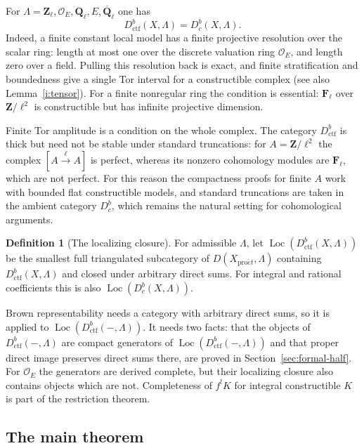 \documentclass[11pt,a4paper]{article}
\numberwithin{equation}{section}
\theoremstyle{definition}
\newtheorem{definition}[theorem]{Definition}
\theoremstyle{remark}
\newcommand{\Dbc}{D^b_c}
\newcommand{\Loc}{\operatorname{Loc}}
\newcommand{\Qbar}{\overline{\mathbf Q}_\ell}
\newcommand{\Ql}{\mathbf Q_\ell}
\newcommand{\Zl}{\mathbf Z_\ell}
\newcommand{\proet}{\mathrm{pro}\acute{e}t}
\newcommand{\Dctf}{D^b_{\mathrm{ctf}}}
\begin{document}
For $\Lambda=\Zl,\mathcal O_E,\Ql,E,\Qbar$ one has
\[
 \Dctf(X,\Lambda)=\Dbc(X,\Lambda).
\]
Indeed, a finite constant local model has a finite projective resolution
over the scalar ring: length at most one over the discrete valuation
ring $\mathcal O_E$, and length zero over a field. Pulling this
resolution back is exact, and finite stratification and boundedness
give a single Tor interval for a constructible complex
(see also Lemma~\ref{i:tensor}). For a finite nonregular ring the
condition is essential: $\mathbf F_\ell$ over $\mathbf Z/\ell^2$ is
constructible but has infinite projective dimension.

Finite Tor amplitude is a condition on the whole complex. The category
$\Dctf$ is thick but need not be stable under standard truncations:
for $A=\mathbf Z/\ell^2$ the complex $[A\xrightarrow{\ell}A]$ is
perfect, whereas its nonzero cohomology modules are $\mathbf F_\ell$,
which are not perfect. For this reason the compactness proofs for
finite $A$ work with bounded flat constructible models, and standard
truncations are taken in the ambient category $\Dbc$, which remains
the natural setting for cohomological arguments.

\begin{definition}[The localizing closure]
For admissible $\Lambda$, let $\Loc(\Dctf(X,\Lambda))$ be
the smallest full triangulated subcategory of $D(X_{\proet},\Lambda)$
containing $\Dctf(X,\Lambda)$ and closed under arbitrary direct sums.
For integral and rational coefficients this is also
$\Loc(\Dbc(X,\Lambda))$.
\end{definition}

Brown representability needs a category with arbitrary direct sums,
so it is applied to $\Loc(\Dctf(-,\Lambda))$. It needs two facts: that
the objects of $\Dctf(-,\Lambda)$ are compact generators of
$\Loc(\Dctf(-,\Lambda))$ and that proper direct image preserves direct
sums there, are proved in Section~\ref{sec:formal-half}. For $\mathcal O_E$ the generators are derived
complete, but their localizing closure also contains objects which
are not. Completeness of $f^!K$ for integral constructible $K$ is
part of the restriction theorem.

\subsection{The main theorem}
\label{n:brown}
\end{document}
